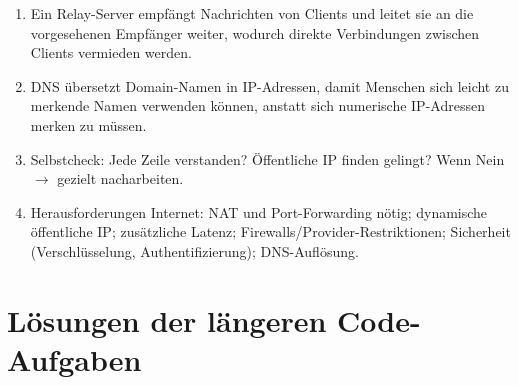 \begin{myexercise}
\begin{myanswer}
\begin{enumerate}
            \item Ein Relay-Server empfängt Nachrichten von Clients und leitet sie an die vorgesehenen Empfänger weiter, wodurch direkte Verbindungen zwischen Clients vermieden werden.
            \item \gls{DNS} übersetzt Domain-Namen in \gls{IP}-Adressen, damit Menschen sich leicht zu merkende Namen verwenden können, anstatt sich numerische \gls{IP}-Adressen merken zu müssen.
            \item Selbstcheck: Jede Zeile verstanden? Öffentliche \acrshort{IP} finden gelingt? Wenn Nein $\rightarrow$ gezielt nacharbeiten.
            \item Herausforderungen Internet: \gls{NAT} und Port-Forwarding nötig; dynamische öffentliche \acrshort{IP}; zusätzliche Latenz; Firewalls/Provider-Restriktionen; Sicherheit (Verschlüsselung, Authentifizierung); \gls{DNS}-Auflösung.
        \end{enumerate}
    \end{myanswer}
\end{myexercise}

\clearpage
\section{Lösungen der längeren Code-Aufgaben}\label{sec:loesungen-chat}
\begin{myanswer}
    
    
\end{myanswer}
\newpage
\begin{myanswer}
    
    
\end{myanswer}
\newpage
\begin{myanswer}
    
    
\end{myanswer}

